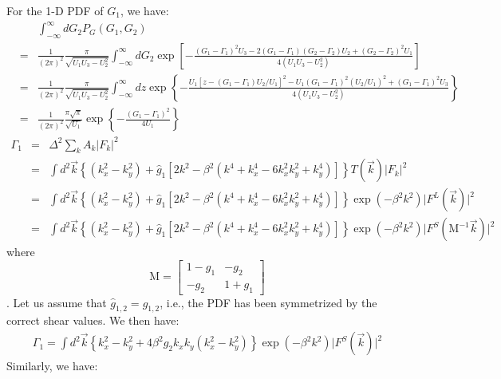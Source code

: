 \documentclass[onecolumn]{aastex62}
\begin{document}
For the 1-D PDF of $G_1$, we have:
\begin{eqnarray}
\label{1d_PDF}
&&\int_{-\infty}^{\infty}dG_2 P_G\left(G_1,G_2\right)\\ \nonumber
&=&\frac{1}{(2\pi)^2}\frac{\pi}{\sqrt{U_1U_3-U_2^2}}\int_{-\infty}^{\infty}dG_2\exp\left[-\frac{\left(G_1-\Gamma_1\right)^2U_3-2\left(G_1-\Gamma_1\right)\left(G_2-\Gamma_2\right)U_2+\left(G_2-\Gamma_2\right)^2U_1}{4(U_1U_3-U_2^2)}\right]\\ \nonumber
&=&\frac{1}{(2\pi)^2}\frac{\pi}{\sqrt{U_1U_3-U_2^2}}\int_{-\infty}^{\infty}dz\exp\left\{-\frac{U_1\left[z-\left(G_1-\Gamma_1\right)U_2/U_1\right]^2-U_1\left(G_1-\Gamma_1\right)^2(U_2/U_1)^2+\left(G_1-\Gamma_1\right)^2U_3}{4(U_1U_3-U_2^2)}\right\}\\ \nonumber
&=&\frac{1}{(2\pi)^2}\frac{\pi\sqrt{\pi}}{\sqrt{U_1}}\exp\left\{-\frac{\left(G_1-\Gamma_1\right)^2}{4U_1}\right\}
\end{eqnarray}
\begin{eqnarray}
\Gamma_1&=&\Delta^2\sum_kA_k\vert F_k\vert^2\\ \nonumber
&=&\int{d}^2\vec{k}\left\{\left(k_x^2-k_y^2\right)+\hat{g}_1\left[2k^2-\beta^2\left(k^4+k_x^4-6k_x^2k_y^2+k_y^4\right)\right]\right\}T(\vec{k})\vert F_k\vert^2\\ \nonumber
&=&\int{d}^2\vec{k}\left\{\left(k_x^2-k_y^2\right)+\hat{g}_1\left[2k^2-\beta^2\left(k^4+k_x^4-6k_x^2k_y^2+k_y^4\right)\right]\right\}\exp(-\beta^2k^2)\vert F^L(\vec{k})\vert^2\\ \nonumber
&=&\int{d}^2\vec{k}\left\{\left(k_x^2-k_y^2\right)+\hat{g}_1\left[2k^2-\beta^2\left(k^4+k_x^4-6k_x^2k_y^2+k_y^4\right)\right]\right\}\exp(-\beta^2k^2)\vert F^S(\mathrm{M}^{-1}\vec{k})\vert^2
\end{eqnarray}
where \[\mathrm{M}=\left[\begin{array}{cc}
	1-g_1 &  -g_2 \\
	-g_2 &  1+g_1 
\end{array}\right]\].
Let us assume that $\hat{g}_{1,2}=g_{1,2}$, i.e., the PDF has been symmetrized by the correct shear values. We then have:
\begin{eqnarray}
\Gamma_1=\int{d}^2\vec{k}\left\{k_x^2-k_y^2+4\beta^2g_2k_xk_y(k_x^2-k_y^2)\right\}\exp(-\beta^2k^2)\vert F^S(\vec{k})\vert^2
\end{eqnarray}
Similarly, we have:
\end{document}
